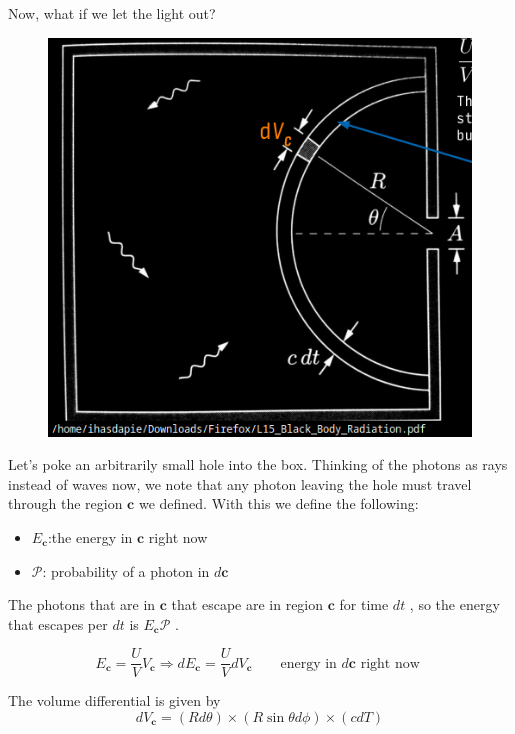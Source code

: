 \documentclass[10pt]{article}
\begin{document}
Now, what if we let the light out?

\begin{figure}[H]
	\centering
	\includegraphics[width=0.8\linewidth]{img/image_2022-04-10-01-26-34.png}
\end{figure}

Let's poke an arbitrarily small hole into the box. 
Thinking of the photons as rays instead of waves now, we note that any photon leaving the hole must travel through the region $ \mathbf{c} $ we defined. 
With this we define the following:
\begin{itemize}
	\item $ E_\mathbf{c} $:the energy in $ \mathbf{c} $ right now
	\item $ \mathcal{P} $: probability of a photon in $ d\mathbf{c} $ 
\end{itemize}

The photons that are in $\mathbf{c}  $ that escape are in region $\mathbf{c}  $ for time $ dt $ , so the energy that escapes per $ dt $ is $ E_\mathbf{c} \mathcal{P} $ .


\begin{equation}
	E_\mathbf{c} = \frac{U}{V}V_\mathbf{c} \Rightarrow dE_\mathbf{c} = \frac{U}{V} dV_\mathbf{c} \qquad\text{energy in } d\mathbf{c} \text{ right now }
\end{equation}

The volume differential is given by
\begin{equation}
	dV_\mathbf{c} = (Rd\theta) \times (R \sin \theta d \phi) \times (cdT)
\end{equation}
\end{document}
